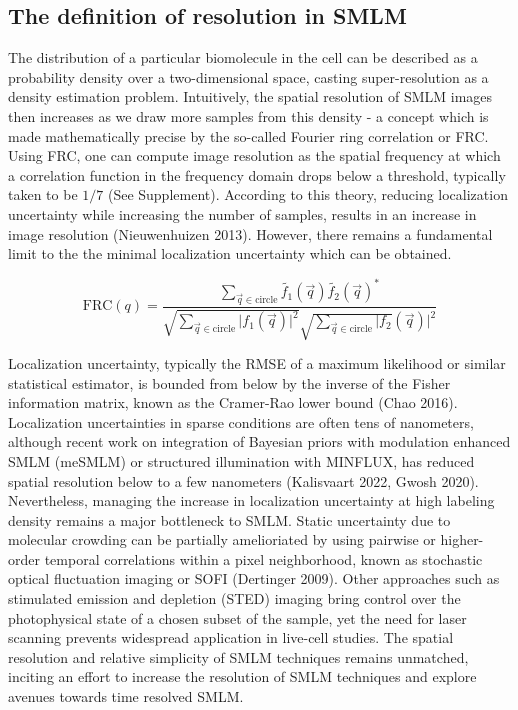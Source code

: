 \subsection{The definition of resolution in SMLM}

The distribution of a particular biomolecule in the cell can be described as a probability density over a two-dimensional space, casting super-resolution as a density estimation problem. Intuitively, the spatial resolution of SMLM images then increases as we draw more samples from this density - a concept which is made mathematically precise by the so-called Fourier ring correlation or FRC. Using FRC, one can compute image resolution as the spatial frequency at which a correlation function in the frequency domain drops below a threshold, typically taken to be $1/7$ (See Supplement). According to this theory, reducing localization uncertainty while increasing the number of samples, results in an increase in image resolution (Nieuwenhuizen 2013). However, there remains a fundamental limit to the the minimal localization uncertainty which can be obtained.


\begin{equation*}
\mathrm{FRC}(q) = \frac{\sum_{\vec{q}\in\mathrm{circle}}\tilde{f_{1}}(\vec{q})\tilde{f_{2}}(\vec{q})^{*}}{\sqrt{\sum_{\vec{q}\in\mathrm{circle}}\lvert f_{1}(\vec{q})\lvert^{2}}\sqrt{\sum_{\vec{q}\in\mathrm{circle}}\lvert f_{2}}(\vec{q})\lvert^{2}}
\end{equation*}


Localization uncertainty, typically the RMSE of a maximum likelihood or similar statistical estimator, is bounded from below by the inverse of the Fisher information matrix, known as the Cramer-Rao lower bound (Chao 2016). Localization uncertainties in sparse conditions are often tens of nanometers, although recent work on integration of Bayesian priors with modulation enhanced SMLM (meSMLM) or structured illumination with MINFLUX, has reduced spatial resolution below to a few nanometers (Kalisvaart 2022, Gwosh 2020). Nevertheless, managing the increase in localization uncertainty at high labeling density remains a major bottleneck to SMLM. Static uncertainty due to molecular crowding can be partially amelioriated by using pairwise or higher-order temporal correlations within a pixel neighborhood, known as stochastic optical fluctuation imaging or SOFI (Dertinger 2009). Other approaches such as stimulated emission and depletion (STED) imaging bring control over the photophysical state of a chosen subset of the sample, yet the need for laser scanning prevents widespread application in live-cell studies. The spatial resolution and relative simplicity of SMLM techniques remains unmatched, inciting an effort to increase the resolution of SMLM techniques and explore avenues towards time resolved SMLM.


